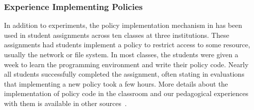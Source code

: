 \subsubsection{Experience Implementing Policies}\label{sec-implementing-policies}

In addition to experiments, 
the policy implementation mechanism in \sysname has 
been used in student assignments across ten classes at three institutions.
These assignments had students implement a policy to restrict access to 
some resource, usually the network or file system.  
%
In most classes, the students were given a week to learn the programming
environment and write their policy code.  Nearly all students successfully
completed the assignment, often stating in evaluations that implementing a new 
policy took a few hours.   More details about the implementation of policy
code in the classroom and our pedagogical experiences with them is available
in other sources~\cite{Cappos_SIGCSE_2014, Hooshangi_SIGCSE_2015}.





